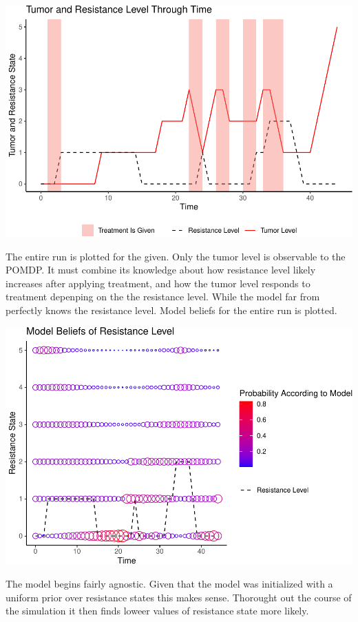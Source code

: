 \documentclass[notspecified,article,submit,moreauthors,pdftex]{Definitions/mdpi}
\begin{document}
\includegraphics{SocultPaper_files/figure-latex/unnamed-chunk-5-1.pdf}

The entire run is plotted for the given. Only the tumor level is
observable to the POMDP. It must combine its knowledge about how
resistance level likely increases after applying treatment, and how the
tumor level responds to treatment depenping on the the resistance level.
While the model far from perfectly knows the resistance level. Model
beliefs for the entire run is plotted.

\includegraphics{SocultPaper_files/figure-latex/unnamed-chunk-6-1.pdf}

The model begins fairly agnostic. Given that the model was initialized
with a uniform prior over resistance states this makes sense. Thorought
out the course of the simulation it then finds loweer values of
resistance state more likely.
\end{document}
